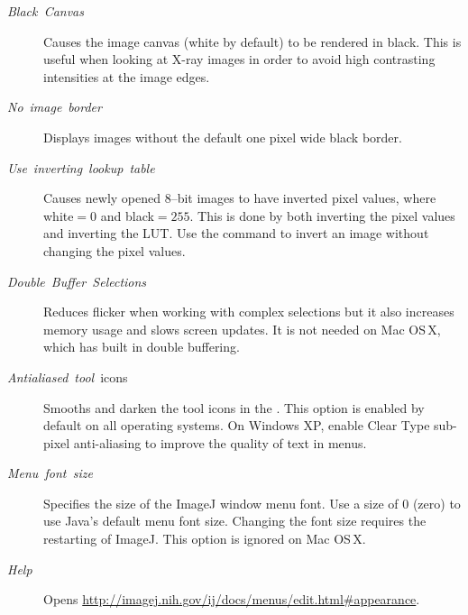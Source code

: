 \begin{description}
\item [{\emph{Black\ Canvas}}] Causes the image canvas (white by default)
to be rendered in black. This is useful when looking at X-ray images
in order to avoid high contrasting intensities at the image edges.
\item [{\emph{No}\ \emph{image}\ \emph{border}}] Displays images without
the default one pixel wide black border.
\item [{\emph{Use}\ \emph{inverting}\ \emph{lookup}\ \emph{table}}] Causes
newly opened 8--bit images to have inverted pixel values, where white$=0$
and black$=255$. This is done by both inverting the pixel values
and inverting the LUT. Use the 
command to invert an image without changing the pixel values.
\item [{\emph{Double\ Buffer\ Selections}}] Reduces flicker when working
with complex selections but it also increases memory usage and slows
screen updates. It is not needed on Mac OS\,X, which has built in
double buffering.
\item [{\emph{Antialiased}\ \emph{tool}\ icons}] Smooths and darken the
tool icons in the . This option is
enabled by default on all operating systems. On Windows XP, enable
Clear Type sub-pixel anti-aliasing to improve the quality of text
in menus.
\item [{\emph{Menu\ font\ size}}] Specifies the size of the ImageJ window
menu font. Use a size of 0 (zero) to use Java's default menu font
size. Changing the font size requires the restarting of ImageJ. This
option is ignored on Mac OS\,X. 
\item [{\emph{Help}}] Opens \url{http://imagej.nih.gov/ij/docs/menus/edit.html#appearance}.
\end{description}



\subsubsection{\protect{}\label{sub:Conversions...}}

